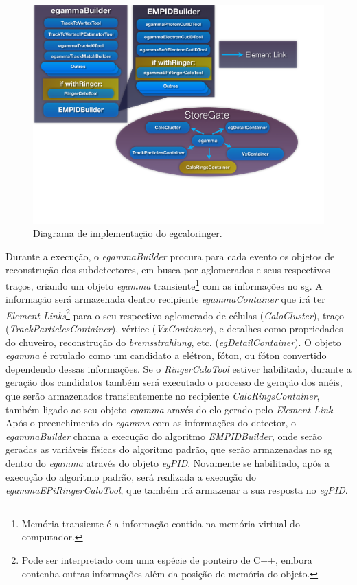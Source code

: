 \begin{figure}[ht!]
\label{fig:implementacao_ringer}
\centering
\includegraphics[width=1.0\textwidth]{imagens/implementacao_ringer.pdf}
\caption[Diagrama de implementação do \protect\gls{egcaloringer}]{Diagrama de
implementação do \gls{egcaloringer}.}
\end{figure}

Durante a execução, o \emph{egammaBuilder}
procura para cada evento os objetos de reconstrução dos subdetectores,
em busca por aglomerados e seus respectivos traços, criando um objeto 
\emph{egamma} transiente\footnote{Memória transiente é a informação contida na memória 
virtual do computador.} com as informações no \gls{sg}. A informação será
armazenada dentro recipiente \emph{egammaContainer} que irá ter \emph{Element
Links}\footnote{Pode ser interpretado com uma espécie de ponteiro de C++, embora
contenha outras informações além da posição de memória do objeto.} para o seu
respectivo aglomerado de células (\emph{CaloCluster}), traço
(\emph{TrackParticlesContainer}), vértice (\emph{VxContainer}), e detalhes como
propriedades do chuveiro, reconstrução do \emph{bremsstrahlung}, etc. (\emph{egDetailContainer}). 
O objeto \emph{egamma} é rotulado como um candidato a elétron, fóton, ou 
fóton convertido dependendo dessas informações. Se o \emph{RingerCaloTool}
estiver habilitado, durante a geração dos candidatos também será executado o
processo de geração dos anéis, que serão armazenados transientemente no
recipiente \emph{CaloRingsContainer}, também ligado ao seu objeto \emph{egamma}
aravés do elo gerado pelo \emph{Element Link}. Após o preenchimento do
\emph{egamma} com as informações do detector, o \emph{egammaBuilder} chama a
execução do algoritmo \emph{EMPIDBuilder}, onde serão geradas as variáveis 
físicas do algoritmo padrão, que serão armazenadas no \gls{sg} dentro do
\emph{egamma} através do objeto \emph{egPID}. Novamente se habilitado, após a
execução do algoritmo padrão, será realizada a execução do
\emph{egammaEPiRingerCaloTool}, que também irá armazenar a sua resposta no
\emph{egPID}.

